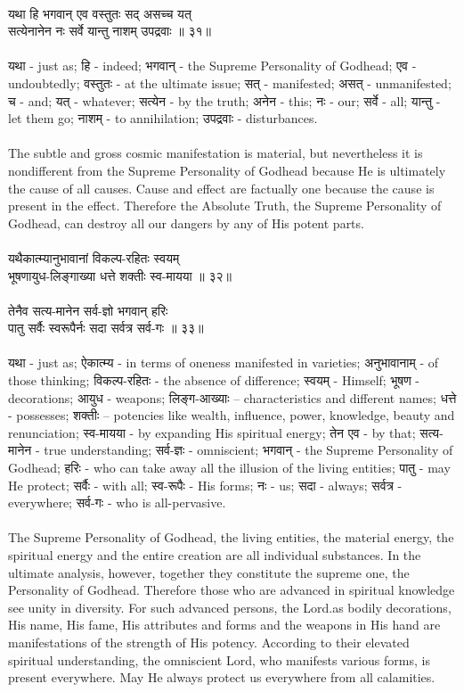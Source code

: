 \\
यथा हि भगवान् एव वस्तुतः सद् असच्च यत्\\
सत्येनानेन नः सर्वे यान्तु नाशम् उपद्रवाः ॥ ३१॥\\
\\
यथा - just as;  हि - indeed;  भगवान् - the Supreme Personality of Godhead;  एव - undoubtedly;  वस्तुतः - at the ultimate issue;  सत् - manifested;  असत् - unmanifested;  च - and;  यत् - whatever;  सत्येन - by the truth;  अनेन -  this;  नः - our;  सर्वे - all;  यान्तु - let them go; नाशम् - to annihilation;  उपद्रवाः - disturbances.\\
\\
The subtle and gross cosmic manifestation is material, but nevertheless it is nondifferent from the Supreme Personality of Godhead because He is ultimately the cause of all causes. Cause and effect are factually one because the cause is present in the effect. Therefore the Absolute Truth, the Supreme Personality of Godhead, can destroy all our dangers by any of His potent parts.\\
\\
यथैकात्म्यानुभावानां विकल्प-रहितः स्वयम्\\
भूषणायुध-लिङ्गाख्या धत्ते शक्तीः स्व-मायया ॥ ३२॥\\
\\
तेनैव सत्य-मानेन सर्व-ज्ञो भगवान् हरिः\\
पातु सर्वैः स्वरूपैर्नः सदा सर्वत्र सर्व-गः ॥ ३३॥\\
\\
यथा - just as;  ऐकात्म्य - in terms of oneness manifested in varieties;  अनुभावानाम् - of those thinking;  विकल्प-रहितः -  the absence of difference;  स्वयम् - Himself;  भूषण - decorations;  आयुध - weapons;  लिङ्ग-आख्याः – characteristics and different names;  धत्ते - possesses;  शक्तीः – potencies like wealth, influence, power, knowledge, beauty and renunciation; स्व-मायया - by expanding His spiritual energy;  तेन एव - by that;  सत्य-मानेन - true understanding;  सर्व-ज्ञः - omniscient;  भगवान् - the Supreme Personality of Godhead; हरिः - who can take away all the illusion of the living entities;  पातु - may He protect;  सर्वैः - with all;  स्व-रूपैः - His forms;  नः - us;  सदा - always;  सर्वत्र - everywhere;  सर्व-गः - who is all-pervasive.\\
\\
The Supreme Personality of Godhead, the living entities, the material energy, the spiritual energy and the entire creation are all individual substances. In the ultimate analysis, however, together they constitute the supreme one, the Personality of Godhead. Therefore those who are advanced in spiritual knowledge see unity in diversity. For such advanced persons, the Lord.as bodily decorations, His name, His fame, His attributes and forms and the weapons in His hand are manifestations of the strength of His potency. According to their elevated spiritual understanding, the omniscient Lord, who manifests various forms, is present everywhere. May He always protect us everywhere from all calamities.\\
